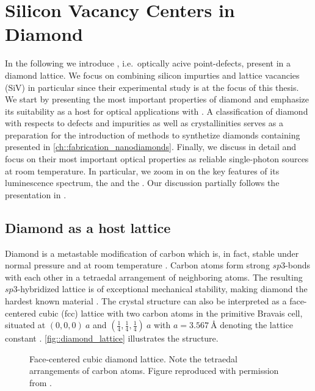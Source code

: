 
\chapter{Silicon Vacancy Centers in Diamond}	\label{ch::sivs}

  In the following we introduce \ccs, i.e.\ optically acive point-defects, present in a diamond lattice. We focus on \ccs combining silicon impurties and lattice vacancies (SiV) in particular since their experimental study is at the focus of this thesis. We start by presenting the most important properties of diamond and emphasize its suitability as a host for optical applications with \ccs. A classification of diamond with respects to defects and impurities as well as crystallinities serves as a preparation for the introduction of methods to synthetize diamonds containing \sivs presented in \autoref{ch::fabrication_nanodiamonds}. Finally, we discuss \sivs in detail and focus on their most important optical properties as reliable single-photon sources at room temperature. In particular, we zoom in on the key features of its luminescence spectrum, the \zpl and the \psb. Our discussion partially follows the presentation in \cite{janine::thesis, neu::thesis, becker::thesis, steinmetz::thesis}.

\section{Diamond as a host lattice}

  Diamond is a metastable modification of carbon which is, in fact, stable under normal pressure and at room temperature \cite{steinmetz::52}. Carbon atoms form strong $sp3$-bonds with each other in a tetraedal arrangement of neighboring atoms. The resulting $sp3$-hybridized lattice is of exceptional mechanical stability, making diamond the hardest known material \cite{Theoretical Strength and Cleavage of Diamond}. The crystal structure can also be interpreted as a face-centered cubic (fcc) lattice with two carbon atoms in the primitive Bravais cell, situated at $(0,0,0) \ a$ and $ (\frac{1}{4}, \frac{1}{4}, \frac{1}{4}) \ a$ with $a = \SI{3.567}{\angstrom}$ denoting the lattice constant \cite{steinmetz::56}. \autoref{fig::diamond_lattice} illustrates the structure.

  \begin{figure}[htbp]
		\centering
		\caption[Face-centered cubic diamond lattice]{Face-centered cubic diamond lattice. Note the tetraedal arrangements of carbon atoms. Figure reproduced with permission from \cite{janine::thesis}.}
		\label{fig::diamond_lattice}
	\end{figure}

